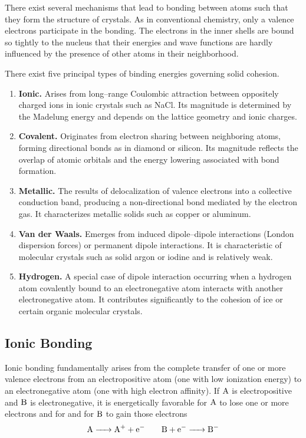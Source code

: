 \documentclass[../../../main.tex]{subfiles}
\begin{document}
There exist several mechanisms that lead to bonding between atoms such that they form the structure of crystals.
As in conventional chemistry, only a valence electrons participate in the bonding.
The electrons in the inner shells are bound so tightly to the nucleus that their energies and wave functions are hardly influenced by the presence of other atoms in their neighborhood.

There exist five principal types of binding energies governing solid cohesion.
\begin{enumerate}
    \item \textbf{Ionic.} Arises from long–range Coulombic attraction between oppositely charged ions in ionic crystals such as NaCl. Its magnitude is determined by the Madelung energy and depends on the lattice geometry and ionic charges.
    \item \textbf{Covalent.} Originates from electron sharing between neighboring atoms, forming directional bonds as in diamond or silicon. Its magnitude reflects the overlap of atomic orbitals and the energy lowering associated with bond formation.
    \item \textbf{Metallic.} The results of delocalization of valence electrons into a collective conduction band, producing a non-directional bond mediated by the electron gas. It characterizes metallic solids such as copper or aluminum.
    \item  \textbf{Van der Waals.} Emerges from induced dipole–dipole interactions (London dispersion forces) or permanent dipole interactions. It is characteristic of molecular crystals such as solid argon or iodine and is relatively weak.
    \item \textbf{Hydrogen.} A special case of dipole interaction occurring when a hydrogen atom covalently bound to an electronegative atom interacts with another electronegative atom. It contributes significantly to the cohesion of ice or certain organic molecular crystals.
\end{enumerate}

\subsection{Ionic Bonding}
Ionic bonding fundamentally arises from the complete transfer of one or more valence electrons from an electropositive atom (one with low ionization energy) to an electronegative atom (one with high electron affinity).
If $\ce{A}$ is electropositive and $\ce{B}$ is electronegative, it is energetically favorable for $\ce{A}$ to lose one or more electrons and for and for $\ce{B}$ to gain those electrons
\begin{equation*}
    \ce{A -> A+ + e-}\qquad \ce{B + e- -> B- }
\end{equation*}
\end{document}
